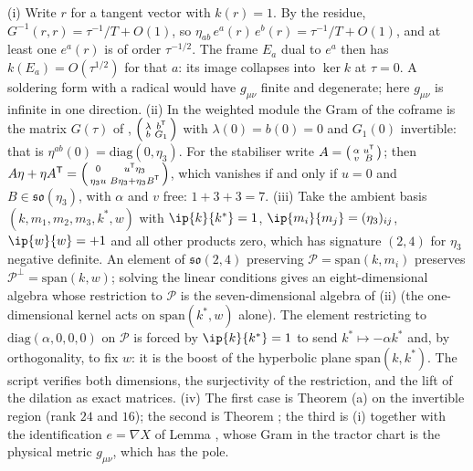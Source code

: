 (i) Write $r$ for a tangent vector with $k(r) = 1$. By the residue, $G^{-1}(r, r) = \tau^{-1}/T + O(1)$, so $\eta_{ab}\,e^a(r)\,e^b(r) = \tau^{-1}/T + O(1)$, and at least one $e^a(r)$ is of order $\tau^{-1/2}$. The frame $E_a$ dual to $e^a$ then has $k(E_a) = O(\tau^{1/2})$ for that $a$: its image collapses into $\ker k$ at $\tau = 0$. A soldering form with a radical would have $g_{\mu\nu}$ finite and degenerate; here $g_{\mu\nu}$ is infinite in one direction. (ii) In the weighted module the Gram of the coframe is the matrix $G(\tau)$ of \cite[proof of Thm.~6.2]{ButlerT4}, $\begin{psmallmatrix}\lambda & b^{\mathsf T}\\ b & G_1\end{psmallmatrix}$ with $\lambda(0) = b(0) = 0$ and $G_1(0)$ invertible: that is $\eta^{ab}(0) = \mathrm{diag}(0, \eta_3)$. For the stabiliser write $A = \begin{psmallmatrix}\alpha & u^{\mathsf T}\\ v & B\end{psmallmatrix}$; then $A\eta + \eta A^{\mathsf T} = \begin{psmallmatrix} 0 & u^{\mathsf T}\eta_3\\ \eta_3 u & B\eta_3 + \eta_3 B^{\mathsf T}\end{psmallmatrix}$, which vanishes if and only if $u = 0$ and $B \in \mathfrak{so}(\eta_3)$, with $\alpha$ and $v$ free: $1 + 3 + 3 = 7$. (iii) Take the ambient basis $(k, m_1, m_2, m_3, k^*, w)$ with $\ip{k}{k^*} = 1$, $\ip{m_i}{m_j} = (\eta_3)_{ij}$, $\ip{w}{w} = +1$ and all other products zero, which has signature $(2,4)$ for $\eta_3$ negative definite. An element of $\mathfrak{so}(2,4)$ preserving $\mathcal{P} = \mathrm{span}(k, m_i)$ preserves $\mathcal{P}^\perp = \mathrm{span}(k, w)$; solving the linear conditions gives an eight-dimensional algebra whose restriction to $\mathcal{P}$ is the seven-dimensional algebra of (ii) (the one-dimensional kernel acts on $\mathrm{span}(k^*, w)$ alone). The element restricting to $\mathrm{diag}(\alpha, 0, 0, 0)$ on $\mathcal{P}$ is forced by $\ip{k}{k^*} = 1$ to send $k^* \mapsto -\alpha k^*$ and, by orthogonality, to fix $w$: it is the boost of the hyperbolic plane $\mathrm{span}(k, k^*)$. The script verifies both dimensions, the surjectivity of the restriction, and the lift of the dilation as exact matrices. (iv) The first case is Theorem (a) on the invertible region (rank $24$ and $16$); the second is Theorem ; the third is (i) together with the identification $e = \nabla X$ of Lemma , whose Gram in the tractor chart is the physical metric $g_{\mu\nu}$, which has the pole.

